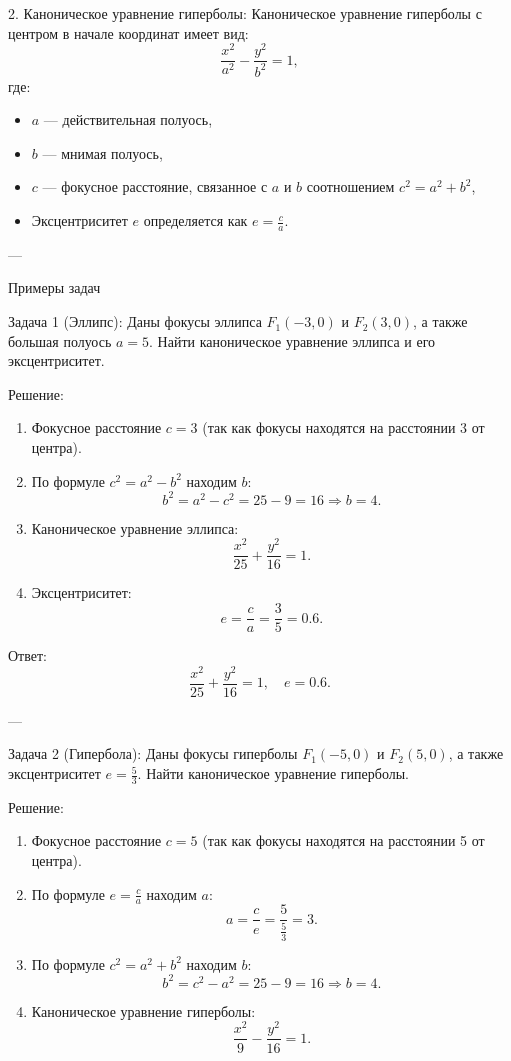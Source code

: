 \documentclass[a4paper,14pt]{extreport} %
\begin{document}
     2. Каноническое уравнение гиперболы:
Каноническое уравнение гиперболы с центром в начале координат имеет вид:
\[
\frac{x^2}{a^2} - \frac{y^2}{b^2} = 1,
\]
где:
\begin{itemize}
    \item \(a\) — действительная полуось,
    \item \(b\) — мнимая полуось,
    \item \(c\) — фокусное расстояние, связанное с \(a\) и \(b\) соотношением \(c^2 = a^2 + b^2\),
    \item Эксцентриситет \(e\) определяется как \(e = \frac{c}{a}\).
\end{itemize}

---

    Примеры задач

     Задача 1 (Эллипс):
Даны фокусы эллипса \(F_1(-3, 0)\) и \(F_2(3, 0)\), а также большая полуось \(a = 5\). Найти каноническое уравнение эллипса и его эксцентриситет.

 Решение: 
\begin{enumerate}
    \item Фокусное расстояние \(c = 3\) (так как фокусы находятся на расстоянии 3 от центра).
    \item По формуле \(c^2 = a^2 - b^2\) находим \(b\):
    \[
    b^2 = a^2 - c^2 = 25 - 9 = 16 \Rightarrow b = 4.
    \]
    \item Каноническое уравнение эллипса:
    \[
    \frac{x^2}{25} + \frac{y^2}{16} = 1.
    \]
    \item Эксцентриситет:
    \[
    e = \frac{c}{a} = \frac{3}{5} = 0.6.
    \]
\end{enumerate}

Ответ:
\[
\boxed{\frac{x^2}{25} + \frac{y^2}{16} = 1, \quad e = 0.6}.
\]

---

     Задача 2 (Гипербола):
Даны фокусы гиперболы \(F_1(-5, 0)\) и \(F_2(5, 0)\), а также эксцентриситет \(e = \frac{5}{3}\). Найти каноническое уравнение гиперболы.

 Решение: 
\begin{enumerate}
    \item Фокусное расстояние \(c = 5\) (так как фокусы находятся на расстоянии 5 от центра).
    \item По формуле \(e = \frac{c}{a}\) находим \(a\):
    \[
    a = \frac{c}{e} = \frac{5}{\frac{5}{3}} = 3.
    \]
    \item По формуле \(c^2 = a^2 + b^2\) находим \(b\):
    \[
    b^2 = c^2 - a^2 = 25 - 9 = 16 \Rightarrow b = 4.
    \]
    \item Каноническое уравнение гиперболы:
    \[
    \frac{x^2}{9} - \frac{y^2}{16} = 1.
    \]
\end{enumerate}
\end{document}
